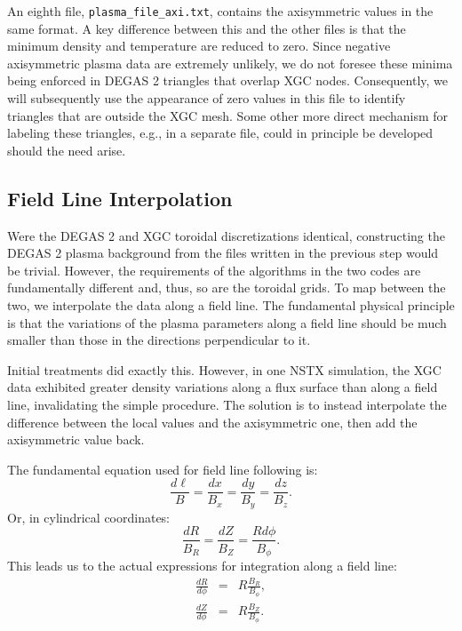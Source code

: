 \documentclass[12pt]{report}
\begin{document}
An eighth file, {\tt plasma\_file\_axi.txt},
contains the axisymmetric values in the same format.  A key
difference between this and the other files is that the minimum
density and temperature are reduced to zero.
Since negative axisymmetric plasma data are extremely unlikely,
we do not foresee these minima being enforced in DEGAS 2
triangles that overlap XGC nodes.  Consequently, we will
subsequently use the appearance of zero values in this file
to identify triangles that are outside the XGC mesh.  Some other
more direct mechanism for labeling these triangles, e.g.,
in a separate file, could
in principle be developed should the need arise.

\subsection{Field Line Interpolation}
\label{fieldline}

Were the DEGAS 2 and XGC toroidal discretizations identical,
constructing the DEGAS 2 plasma background from the files
written in the previous step would be trivial.  However,
the requirements of the algorithms in the two codes
are fundamentally different and, thus, so are the toroidal
grids.  To map between the two, we interpolate the
data along a field line.  The fundamental physical
principle is that the variations of the plasma parameters
along a field line should be much smaller than those
in the directions perpendicular to it.

Initial treatments did exactly this.  However, in one
NSTX simulation, the XGC data exhibited greater density
variations along a flux surface than along a field line,
invalidating the simple procedure.  The solution is
to instead interpolate the difference between the local
values and the axisymmetric one, then add the axisymmetric
value back.

The fundamental equation used for field line
following is:
\begin{equation}
  \frac{d \ell}{B} = \frac{dx}{B_{x}} = \frac{dy}{B_{y}}
  = \frac{dz}{B_{z}}.
\end{equation}
Or, in cylindrical coordinates:
\begin{equation}
  \frac{dR}{B_{R}} = \frac{dZ}{B_{Z}} = \frac{R d \phi}{B_{\phi}}.
\end{equation}
This leads us to the actual expressions for integration
along a field line:
\begin{eqnarray}
  \frac{dR}{d \phi} & = & R \frac{B_{R}}{B_{\phi}}, \label{Rphi} \\
  \frac{dZ}{d \phi} & = & R \frac{B_{Z}}{B_{\phi}}.
                          \label{Zphi}
\end{eqnarray}
\end{document}
